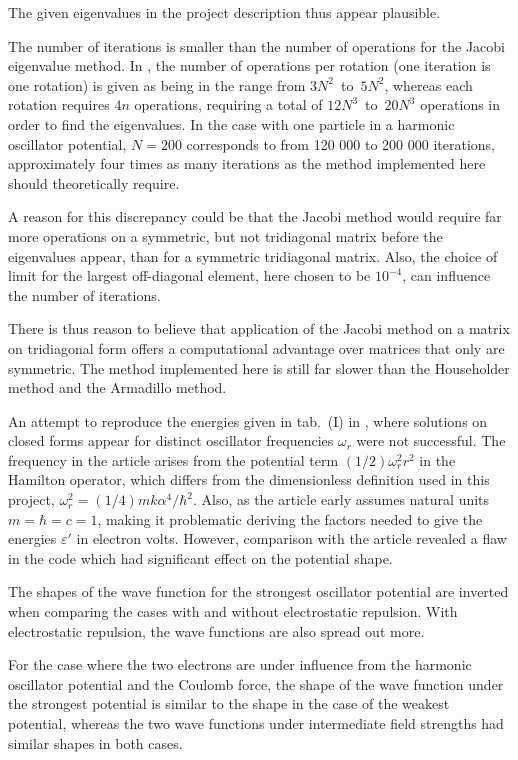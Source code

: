 \documentclass[a4paper,11pt]{article}
\begin{document}
The given eigenvalues in the project description thus appear plausible.

The number of iterations is smaller than the number of operations for the Jacobi eigenvalue method. In \cite{MHJensen:2012}, the number of operations per rotation (one iteration is one rotation) is given as being in the range from $3N^2$~to~$5N^2$, whereas each rotation requires $4n$ operations, requiring a total of $12N^3$~to~$20N^3$ operations in order to find the eigenvalues. In the case with one particle in a harmonic oscillator potential, $N=200$ corresponds to from 120 000 to 200 000 iterations, approximately four times as many iterations as the method implemented here should theoretically require.

A reason for this discrepancy could be that the Jacobi method would require far more operations on a symmetric, but not tridiagonal matrix before the eigenvalues appear, than for a symmetric tridiagonal matrix. Also, the choice of limit for the largest off-diagonal element, here chosen to be $10^{-4}$, can influence the number of iterations.

There is thus reason to believe that application of the Jacobi method on a matrix on tridiagonal form offers a computational advantage over matrices that only are symmetric. The method implemented here is still far slower than the Householder method and the Armadillo method.

An attempt to reproduce the energies given in tab.~(I) in \cite{Taut:1993}, where solutions on closed forms appear for distinct oscillator frequencies $\omega_r$ were not successful. The frequency in the article arises from the potential term $(1/2)\omega_r^2 r^2$ in the Hamilton operator, which differs from the dimensionless definition used in this project, $\omega_r^2 = (1/4) mk\alpha^4 / \hbar^2$. Also, as the article early assumes natural units $m = \hbar = c = 1$, making it problematic deriving the factors needed to give the energies $\varepsilon'$ in electron volts. However, comparison with the article revealed a flaw in the code which had significant effect on the potential shape.

The shapes of the wave function for the strongest oscillator potential are inverted when comparing the cases with and without electrostatic repulsion. With electrostatic repulsion, the wave functions are also spread out more.

For the case where the two electrons are under influence from the harmonic oscillator potential and the Coulomb force, the shape of the wave function under the strongest potential is similar to the shape in the case of the weakest potential, whereas the two wave functions under intermediate field strengths had similar shapes in both cases.
\end{document}
